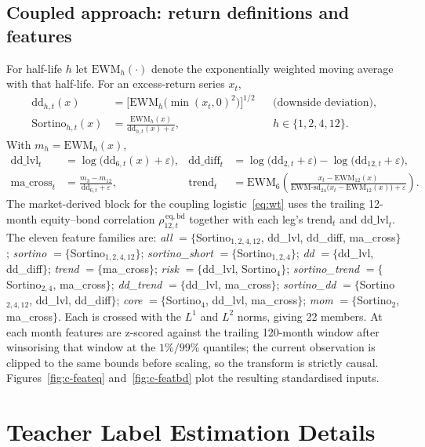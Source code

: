 \subsection{Coupled approach: return definitions and features}
For half-life $h$ let $\mathrm{EWM}_{h}(\cdot)$ denote the exponentially weighted moving
average with that half-life. For an excess-return series $x_t$,
\begin{align}
\mathrm{dd}_{h,t}(x) &= \Big[\mathrm{EWM}_{h}\big(\min(x_t,0)^2\big)\Big]^{1/2}
&&\text{(downside deviation),}\\
\mathrm{Sortino}_{h,t}(x) &= \frac{\mathrm{EWM}_{h}(x)}{\mathrm{dd}_{h,t}(x)+\varepsilon},
&& h\in\{1,2,4,12\}.
\end{align}
With $m_h=\mathrm{EWM}_{h}(x)$,
\begin{align}
\mathrm{dd\_lvl}_t &= \log\!\big(\mathrm{dd}_{6,t}(x)+\varepsilon\big), &
\mathrm{dd\_diff}_t &= \log\!\big(\mathrm{dd}_{2,t}+\varepsilon\big)-\log\!\big(\mathrm{dd}_{12,t}+\varepsilon\big),\\
\mathrm{ma\_cross}_t &= \frac{m_{3}-m_{12}}{\mathrm{dd}_{6,t}+\varepsilon}, &
\mathrm{trend}_t &= \mathrm{EWM}_{6}\!\left(\frac{x_t-\mathrm{EWM}_{12}(x)}{\mathrm{EWM\text{-}sd}_{24}\!\big(x_t-\mathrm{EWM}_{12}(x)\big)+\varepsilon}\right).
\end{align}
The market-derived block for the coupling logistic~\eqref{eq:wt} uses the trailing 12-month
equity--bond correlation $\rho^{\,\mathrm{eq,bd}}_{12,t}$ together with each leg's
$\mathrm{trend}_t$ and $\mathrm{dd\_lvl}_t$. The eleven feature families are: \emph{all}
$=\{$Sortino$_{1,2,4,12}$, dd\_lvl, dd\_diff, ma\_cross$\}$; \emph{sortino}
$=\{$Sortino$_{1,2,4,12}\}$; \emph{sortino\_short} $=\{$Sortino$_{1,2,4}\}$; \emph{dd}
$=\{$dd\_lvl, dd\_diff$\}$; \emph{trend} $=\{$ma\_cross$\}$; \emph{risk} $=\{$dd\_lvl,
Sortino$_4\}$; \emph{sortino\_trend} $=\{$Sortino$_{2,4}$, ma\_cross$\}$; \emph{dd\_trend}
$=\{$dd\_lvl, ma\_cross$\}$; \emph{sortino\_dd} $=\{$Sortino$_{2,4,12}$, dd\_lvl, dd\_diff$\}$;
\emph{core} $=\{$Sortino$_4$, dd\_lvl, ma\_cross$\}$; \emph{mom} $=\{$Sortino$_2$,
ma\_cross$\}$. Each is crossed with the $L^1$ and $L^2$ norms, giving 22 members. At each
month features are z-scored against the trailing 120-month window after winsorising that
window at the $1\%/99\%$ quantiles; the current observation is clipped to the same bounds
before scaling, so the transform is strictly causal. Figures~\ref{fig:c-feateq}
and~\ref{fig:c-featbd} plot the resulting standardised inputs.

\section{Teacher Label Estimation Details}
\label{app:teacher-labels}
\label{app:teacher-independent}

